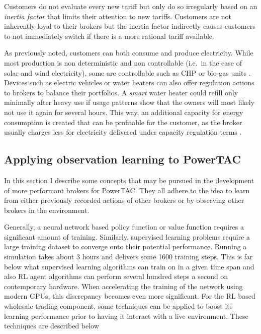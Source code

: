 Customers do not evaluate every new tariff but only do so irregularly based on an \emph{inertia factor} that limits
their attention to new tariffs. Customers are not inherently loyal to their brokers but the inertia factor
indirectly causes customers to not immediately switch if there is a more rational tariff available.

As previously noted, customers can both consume and produce electricity. While most production is non deterministic
and non controllable (i.e.\ in the case of solar and wind electricity), some are controllable such as \ac{CHP} or
bio-gas units \citep[p.16]{ketter2018powertac}. Devices such as electric vehicles or water heaters can also offer
regulation actions to brokers to balance their portfolios. A \emph{smart} water heater could refill only minimally
after heavy use if usage patterns show that the owners will most likely not use it again for several hours. This
way, an additional capacity for energy consumption is created that can be profitable for the customer, as the broker
usually charges less for electricity delivered under capacity regulation terms \citep[p.14ff.]{ketter2018powertac}.

\subsection{Applying observation learning to PowerTAC}%
\label{sub:applying_observation_learning_to_powertac}

In this section I describe some concepts that may be pursued in the development of more performant brokers for
\ac{PowerTAC}. They all adhere to the idea to learn from either previously recorded actions of other brokers or by
observing other brokers in the environment.

Generally, a neural network based policy function or value function requires
a significant amount of training. Similarly, supervised learning problems require a large training dataset to converge
onto their potential performance. Running a simulation takes about 3 hours and delivers some 1600 training steps. This
is far below what supervised learning algorithms can train on in a given time span and also \ac{RL} agent algorithms can
perform several hundred steps a second on contemporary hardware. When accelerating the training of the network using
modern \ac{GPU}s, this discrepancy becomes even more significant. For the \ac{RL} based wholesale trading component,
some techniques can be applied to boost its learning performance prior to having it interact with a live environment.
These techniques are described below

